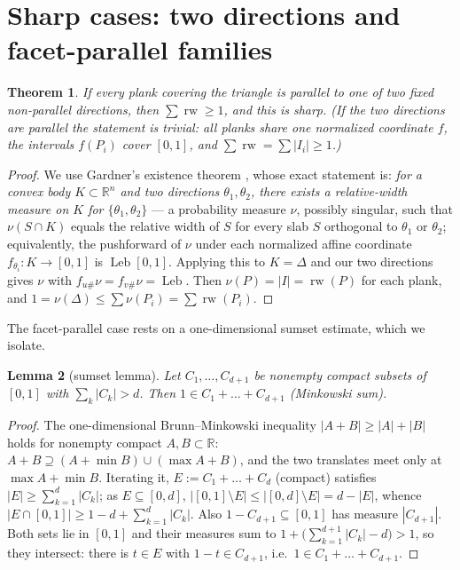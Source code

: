 \documentclass[11pt,reqno]{amsart}
\theoremstyle{plain}
\newtheorem{theorem}{Theorem}[section]
\newtheorem{lemma}[theorem]{Lemma}
\theoremstyle{definition}
\theoremstyle{remark}
\newcommand{\rw}{\operatorname{rw}}
\newcommand{\Leb}{\operatorname{Leb}}
\newcommand{\R}{\mathbb{R}}
\begin{document}
\section{Sharp cases: two directions and facet-parallel families}\label{sec:sharp}
\begin{theorem}\label{thm:twodir}
If every plank covering the triangle is parallel to one of two fixed
\emph{non-parallel} directions, then $\sum\rw\ge1$, and this is sharp. (If the two
directions are parallel the statement is trivial: all planks share one normalized
coordinate $f$, the intervals $f(P_i)$ cover $[0,1]$, and $\sum\rw=\sum|I_i|\ge1$.)
\end{theorem}
\begin{proof}
We use Gardner's existence theorem \cite[Theorem~1]{Gardner88}, whose exact
statement is: \emph{for a convex body $K\subset\R^n$ and two directions
$\theta_1,\theta_2$, there exists a relative-width measure on $K$ for
$\{\theta_1,\theta_2\}$} --- a probability measure $\nu$, possibly singular,
such that $\nu(S\cap K)$ equals the relative width of $S$ for every slab $S$
orthogonal to $\theta_1$ or $\theta_2$; equivalently, the pushforward of $\nu$
under each normalized affine coordinate $f_{\theta_i}:K\to[0,1]$ is
$\Leb[0,1]$. Applying this to $K=\Delta$ and our two directions gives $\nu$
with $f_{u\#}\nu=f_{v\#}\nu=\Leb$. Then $\nu(P)=|I|=\rw(P)$ for each plank, and
$1=\nu(\Delta)\le\sum\nu(P_i)=\sum\rw(P_i)$.
\end{proof}
The facet-parallel case rests on a one-dimensional sumset estimate, which we
isolate.

\begin{lemma}[sumset lemma]\label{lem:sumset}
Let $C_1,\dots,C_{d+1}$ be nonempty compact subsets of $[0,1]$ with
$\sum_k|C_k|>d$. Then $1\in C_1+\dots+C_{d+1}$ (Minkowski sum).
\end{lemma}
\begin{proof}
The one-dimensional Brunn--Minkowski inequality $|A+B|\ge|A|+|B|$ holds for
nonempty compact $A,B\subset\R$: $A+B\supseteq(A+\min B)\cup(\max A+B)$, and
the two translates meet only at $\max A+\min B$. Iterating it,
$E:=C_1+\dots+C_d$ (compact) satisfies $|E|\ge\sum_{k=1}^d|C_k|$; as
$E\subseteq[0,d]$,
$|[0,1]\setminus E|\le|[0,d]\setminus E|=d-|E|$, whence
$|E\cap[0,1]|\ge1-d+\sum_{k=1}^d|C_k|$. Also $1-C_{d+1}\subseteq[0,1]$ has
measure $|C_{d+1}|$. Both sets lie in $[0,1]$ and their measures sum to
$1+\bigl(\sum_{k=1}^{d+1}|C_k|-d\bigr)>1$, so they intersect: there is $t\in E$
with $1-t\in C_{d+1}$, i.e.\ $1\in C_1+\dots+C_{d+1}$.
\end{proof}
\end{document}
